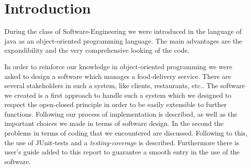 \section{Introduction}
During the class of Software-Engineering we were introduced in the language of java as an object-oriented 
programming language. The main advantages are the expandibility and the very comprehensive looking of 
the code.

In order to reinforce our knowledge in object-oriented programming we were asked to design a software
which manages a food-delivery service. There are several stakeholders in such a system, like clients, 
restaurants, etc.. The software we created is a first approach to handle such a system which we
designed to respect the open-closed principle in order to be easily extensible to further functions.
Following our process of implementation is described, as well as the important choices we made in 
terms of software design. In the second the problems in terms of coding that we encountered are 
discussed. Following to this, the use of JUnit-tests and a \textit{testing-coverage} is described.
Furthermore there is user's guide added to this report to guarantee a smooth entry in the use of the
software.
